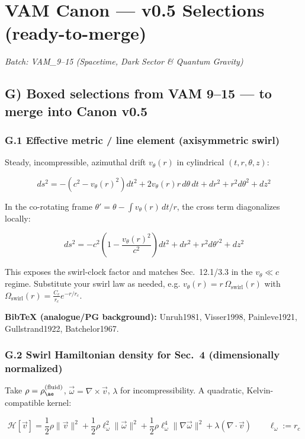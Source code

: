 \documentclass[11pt]{article}
\begin{document}
    \chapter*{VAM Canon — v0.5 Selections (ready-to-merge)}

    \textit{Batch: VAM\_9--15 (Spacetime, Dark Sector \& Quantum Gravity)}

    \section*{G) Boxed selections from VAM 9--15 --- to merge into Canon v0.5}

    \subsection*{G.1 Effective metric / line element (axisymmetric swirl)}

    Steady, incompressible, azimuthal drift $v_\theta(r)$ in cylindrical $(t,r,\theta,z)$:

    \[
        \boxed{
            ds^2 = -\left(c^2 - v_\theta(r)^2\right) dt^2 + 2 v_\theta(r) r\, d\theta\, dt + dr^2 + r^2 d\theta^2 + dz^2
        }
    \]

    In the co-rotating frame $\theta' = \theta - \int v_\theta(r)\,dt / r$, the cross term diagonalizes locally:

    \[
        \boxed{
            ds^2 = -c^2\left(1 - \frac{v_\theta(r)^2}{c^2}\right) dt^2 + dr^2 + r^2 d\theta'^2 + dz^2
        }
    \]

    This exposes the swirl-clock factor and matches Sec.~12.1/3.3 in the $v_\theta \ll c$ regime. Substitute your swirl law as needed, e.g. $v_\theta(r) = r\,\Omega_{\text{swirl}}(r)$ with $\Omega_{\text{swirl}}(r) = \frac{C_e}{r_c} e^{-r/r_c}$.

    \textbf{BibTeX (analogue/PG background):} Unruh1981, Visser1998, Painleve1921, Gullstrand1922, Batchelor1967.

    \subsection*{G.2 Swirl Hamiltonian density for Sec.~4 (dimensionally normalized)}

    Take $\rho = \rho_{\ae}^{(\text{fluid})}$, $\vec{\omega} = \nabla \times \vec{v}$, $\lambda$ for incompressibility. A quadratic, Kelvin-compatible kernel:

    \[
        \boxed{
            \mathcal{H}[\vec{v}] = \frac{1}{2} \rho \lVert \vec{v} \rVert^2 + \frac{1}{2} \rho \ell_\omega^2 \lVert \vec{\omega} \rVert^2 + \frac{1}{2} \rho \ell_\omega^4 \lVert \nabla \vec{\omega} \rVert^2 + \lambda (\nabla \cdot \vec{v})
        }
        \qquad \ell_\omega := r_c
    \]
\end{document}
